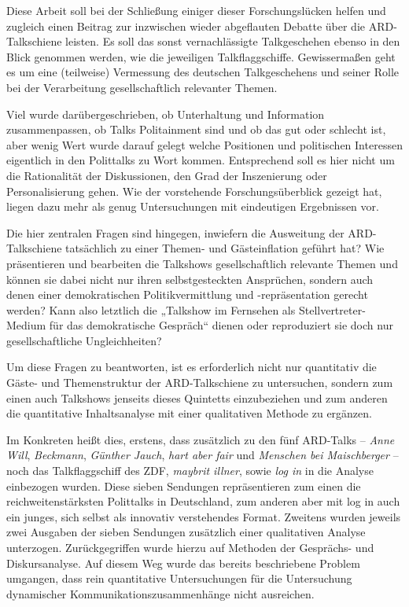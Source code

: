 Diese Arbeit soll bei der Schließung einiger dieser Forschungslücken helfen und zugleich einen Beitrag zur inzwischen wieder abgeflauten Debatte über die ARD-Talkschiene leisten. Es soll das sonst vernachlässigte Talkgeschehen ebenso in den Blick genommen werden, wie die jeweiligen Talkflaggschiffe. Gewissermaßen geht es um eine (teilweise) Vermessung des deutschen Talkgeschehens und seiner Rolle bei der Verarbeitung gesellschaftlich relevanter Themen.

Viel wurde darübergeschrieben, ob Unterhaltung und Information zusammenpassen, ob Talks Politainment sind und ob das gut oder schlecht ist, aber wenig Wert wurde darauf gelegt welche Positionen und politischen Interessen eigentlich in den Polittalks zu Wort kommen. Entsprechend soll es hier nicht um die Rationalität der Diskussionen, den Grad der Inszenierung oder Personalisierung gehen. Wie der vorstehende Forschungsüberblick gezeigt hat, liegen dazu mehr als genug Untersuchungen mit eindeutigen Ergebnissen vor.

Die hier zentralen Fragen sind hingegen, inwiefern die Ausweitung der ARD-Talkschiene tatsächlich zu einer Themen- und Gästeinflation geführt hat? Wie präsentieren und bearbeiten die Talkshows gesellschaftlich relevante Themen und können sie dabei nicht nur ihren selbstgesteckten Ansprüchen, sondern auch denen einer demokratischen Politikvermittlung und -repräsentation gerecht werden? Kann also letztlich die „Talkshow im Fernsehen als Stellvertreter-Medium für das demokratische Gespräch“ \parencite{hieberTalkshowMarathonARDNach2011} dienen oder reproduziert sie doch nur gesellschaftliche Ungleichheiten?

Um diese Fragen zu beantworten, ist es erforderlich nicht nur quantitativ die Gäste- und Themenstruktur der ARD-Talkschiene zu untersuchen, sondern zum einen auch Talkshows jenseits dieses Quintetts einzubeziehen und zum anderen die quantitative Inhaltsanalyse mit einer qualitativen Methode zu ergänzen.

Im Konkreten heißt dies, erstens, dass zusätzlich zu den fünf ARD-Talks – \textit{Anne Will}, \textit{Beckmann}, \textit{Günther Jauch}, \textit{hart aber fair} und \textit{Menschen bei Maischberger} – noch das Talkflaggschiff des ZDF, \textit{maybrit illner}, sowie \textit{log in} in die Analyse einbezogen wurden. Diese sieben Sendungen repräsentieren zum einen die reichweitenstärksten Polittalks in Deutschland, zum anderen aber mit log in auch ein junges, sich selbst als innovativ verstehendes Format. Zweitens wurden jeweils zwei Ausgaben der sieben Sendungen zusätzlich einer qualitativen Analyse unterzogen. Zurückgegriffen wurde hierzu auf Methoden der Gesprächs- und Diskursanalyse. Auf diesem Weg wurde das bereits beschriebene Problem umgangen, dass rein quantitative Untersuchungen für die Untersuchung dynamischer Kommunikationszusammenhänge nicht ausreichen.

